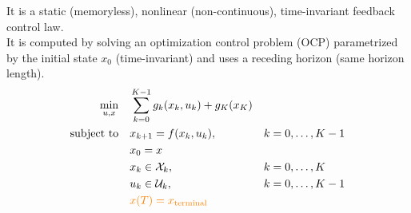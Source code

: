 It is a static (memoryless), nonlinear (non-continuous), time-invariant feedback control law. \\
It is computed by solving an optimization control problem (OCP) parametrized by the initial state $x_0$ (time-invariant) and uses a receding horizon (same horizon length).
\begin{alignat*}{2}
    \min_{u, x} \quad & \sum_{k=0}^{K-1} g_k(x_k, u_k) + g_K(x_K) &&\\
    \text{subject to} \quad & x_{k+1} = f(x_k, u_k), &&k = 0, \ldots, K-1 \\
    & x_0 = x &&\\
    & x_k \in \mathcal{X}_k, &&k = 0, \ldots, K \\
    & u_k \in \mathcal{U}_k, &&k = 0, \ldots, K-1 \\
    & {\color{orange}x(T) = x_{\text{terminal}}} && 
\end{alignat*}

